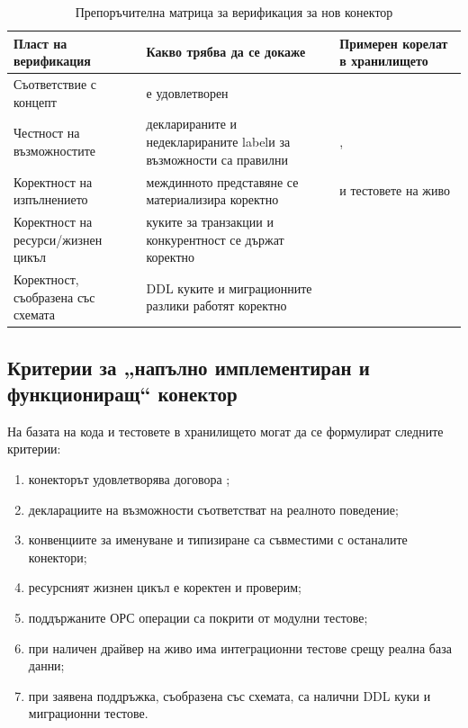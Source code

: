 \begin{table}[H]
\centering
\small
\caption{Препоръчителна матрица за верификация за нов конектор}
\label{tab:connector_verification_matrix}
\begin{tabularx}{\textwidth}{L{3.0cm}L{3.3cm}Y}
\toprule
\textbf{Пласт на верификация} & \textbf{Какво трябва да се докаже} & \textbf{Примерен корелат в хранилището} \\
\midrule
Съответствие с концепт &  е удовлетворен &  \\
Честност на възможностите & декларираните и недекларираните labelи за възможности са правилни & ,  \\
Коректност на изпълнението & междинното представяне се материализира коректно &  и тестовете на живо \\
Коректност на ресурси/жизнен цикъл & куките за транзакции и конкурентност се държат коректно &  \\
Коректност, съобразена със схемата & DDL куките и миграционните разлики работят коректно &  \\
\bottomrule
\end{tabularx}
\end{table}

\subsection{Критерии за „напълно имплементиран и функциониращ“ конектор}

На базата на кода и тестовете в хранилището могат да се формулират следните критерии:

\begin{enumerate}[label=\arabic*.]
    \item конекторът удовлетворява договора ;
    \item декларациите на възможности съответстват на реалното поведение;
    \item конвенциите за именуване и типизиране са съвместими с останалите конектори;
    \item ресурсният жизнен цикъл е коректен и проверим;
    \item поддържаните ОРС операции са покрити от модулни тестове;
    \item при наличен драйвер на живо има интеграционни тестове срещу реална база данни;
    \item при заявена поддръжка, съобразена със схемата, са налични DDL куки и миграционни тестове.
\end{enumerate}

